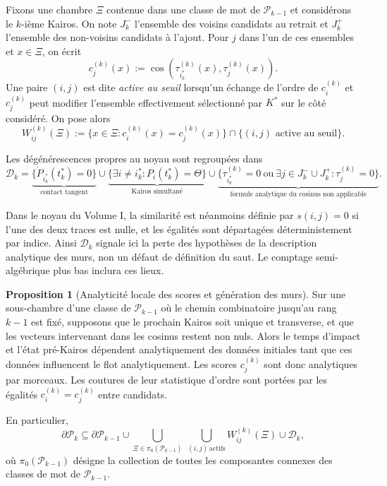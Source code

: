 \documentclass[11pt,a4paper]{article}
\theoremstyle{definition}
\newtheorem{propositionthm}[definition]{Proposition}
\theoremstyle{remark}
\begin{document}
Fixons une chambre $\Xi$ contenue dans une classe de mot de $\mathcal P_{k-1}$ et considérons le $k$-ième Kairos. On note $J_k^-$ l'ensemble des voisins candidats au retrait et $J_k^+$ l'ensemble des non-voisins candidats à l'ajout. Pour $j$ dans l'un de ces ensembles et $x\in\Xi$, on écrit
\[
 c_j^{(k)}(x)
 :=\cos\!\left(\tau_{i_k^*}^{(k)}(x),\tau_j^{(k)}(x)\right).
\]
Une paire $(i,j)$ est dite \emph{active au seuil} lorsqu'un échange de l'ordre de $c_i^{(k)}$ et $c_j^{(k)}$ peut modifier l'ensemble effectivement sélectionné par $K^*$ sur le côté considéré. On pose alors
\[
 W_{ij}^{(k)}(\Xi)
 :=\{x\in\Xi:c_i^{(k)}(x)=c_j^{(k)}(x)\}
 \cap\{(i,j)\text{ active au seuil}\}.
\]

Les dégénérescences propres au noyau sont regroupées dans
\[
\mathcal D_k
=
\underbrace{\{\dot P_{i_k^*}(t_k^*)=0\}}_{\text{contact tangent}}
\cup
\underbrace{\{\exists i\neq i_k^*:P_i(t_k^*)=\Theta\}}_{\text{Kairos simultané}}
\cup
\underbrace{\{\tau_{i_k^*}^{(k)}=0\ \text{ou}\ \exists j\in J_k^-\cup J_k^+:\tau_j^{(k)}=0\}}_{\text{formule analytique du cosinus non applicable}}.
\]

Dans le noyau du Volume I, la similarité est néanmoins définie par $s(i,j)=0$ si l'une des deux traces est nulle, et les égalités sont départagées déterministement par indice. Ainsi $\mathcal D_k$ signale ici la perte des hypothèses de la description analytique des murs, non un défaut de définition du saut. Le comptage semi-algébrique plus bas inclura ces lieux.

\begin{propositionthm}[Analyticité locale des scores et génération des murs]
Sur une sous-chambre d'une classe de $\mathcal P_{k-1}$ où le chemin combinatoire jusqu'au rang $k-1$ est fixé, supposons que le prochain Kairos soit unique et transverse, et que les vecteurs intervenant dans les cosinus restent non nuls. Alors le temps d'impact et l'état pré-Kairos dépendent analytiquement des données initiales tant que ces données influencent le flot analytiquement. Les scores $c_j^{(k)}$ sont donc analytiques par morceaux. Les coutures de leur statistique d'ordre sont portées par les égalités $c_i^{(k)}=c_j^{(k)}$ entre candidats.

En particulier,
\[
 \partial\mathcal P_k
 \subseteq
 \partial\mathcal P_{k-1}
 \cup
 \bigcup_{\Xi\in\pi_0(\mathcal P_{k-1})}
 \ \bigcup_{(i,j)\,\mathrm{actifs}}
 W_{ij}^{(k)}(\Xi)
 \cup
 \mathcal D_k,
\]
où $\pi_0(\mathcal P_{k-1})$ désigne la collection de toutes les composantes connexes des classes de mot de $\mathcal P_{k-1}$.
\end{propositionthm}
\end{document}
